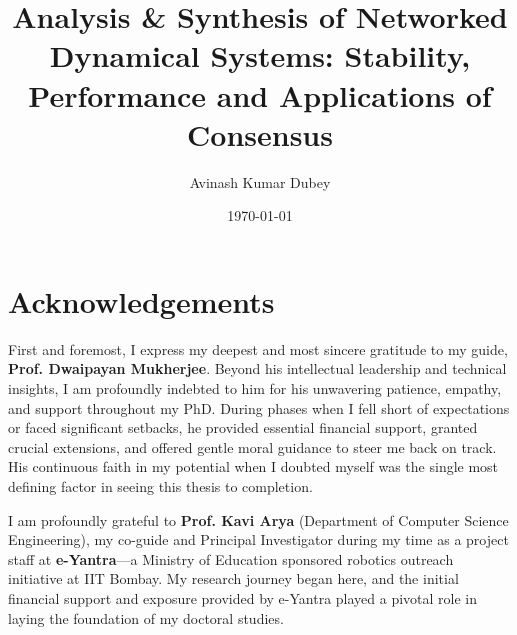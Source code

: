 \clearpage 
{}
\title{Analysis \& Synthesis of Networked Dynamical Systems: Stability, Performance and Applications of Consensus}
\author{Avinash Kumar Dubey}
\date{\today}
\thesis
{}
\maketitle
\cleardoublepage
\chapter*{Acknowledgements}
\thispagestyle{plain}
\raggedbottom
First and foremost, I express my deepest and most sincere gratitude to my guide, \textbf{Prof. Dwaipayan Mukherjee}. Beyond his intellectual leadership and technical insights, I am profoundly indebted to him for his unwavering patience, empathy, and support throughout my PhD. During phases when I fell short of expectations or faced significant setbacks, he provided essential financial support, granted crucial extensions, and offered gentle moral guidance to steer me back on track. His continuous faith in my potential when I doubted myself was the single most defining factor in seeing this thesis to completion.

I am profoundly grateful to \textbf{Prof. Kavi Arya} (Department of Computer Science Engineering), my co-guide and Principal Investigator during my time as a project staff at \textbf{e-Yantra}—a Ministry of Education sponsored robotics outreach initiative at IIT Bombay. My research journey began here, and the initial financial support and exposure provided by e-Yantra played a pivotal role in laying the foundation of my doctoral studies. 

